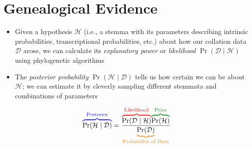 \documentclass[10pt]{beamer}
\begin{document}
	\section{Genealogical Evidence}
	\begin{frame}
		\begin{itemize}
			\item Given a hypothesis $\mathcal{H}$ (i.e., a stemma with its parameters describing intrinsic probabilities, transcriptional probabilities, etc.) about how our collation data $\mathcal{D}$ arose, we can calculate its \emph{explanatory power} or \emph{likelihood} $\Pr(\mathcal{D} \mid \mathcal{H})$ using phylogenetic algorithms
			\item The \emph{posterior probability} $\Pr(\mathcal{H} \mid \mathcal{D})$ tells us how certain we can be about $\mathcal{H}$; we can estimate it by cleverly sampling different stemmata and combinations of parameters
		\end{itemize}
		\vspace{3\baselineskip}
		\begin{equation*}
			{\color{blue}\overbrace{\color{black}\Pr(\mathcal{H} \mid \mathcal{D})}^{\text{Posterior}}}
			= \frac{
			{\color{red}\overbrace{\color{black}\Pr(\mathcal{D} \mid \mathcal{H})}^{\text{Likelihood}}}
			{\color{green!50!black}\overbrace{\color{black}\Pr(\mathcal{H})}^{\text{Prior}}}
			}{
			{\color{orange}\underbrace{{\color{black}\Pr(\mathcal{D})}}_{\text{Probability of Data}}}
			}
		\end{equation*}
		\vspace{3.75\baselineskip}
	\end{frame}
\end{document}

